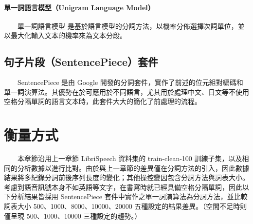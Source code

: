 \paragraph{單一詞語言模型（Unigram Language Model）} \hfill \break
%
　　單一詞語言模型 \cite{kudo2018subword} 是基於語言模型的分詞方法，以機率分佈選擇次詞單位，並以最大化輸入文本的機率來為文本分段。

\subsection{句子片段（SentencePiece）套件}

　　SentencePiece \cite{kudo_sentencepiece_2018}
是由 Google 開發的分詞套件，實作了前述的位元組對編碼和單一詞演算法。其優勢在於可應用於不同語言，尤其用於處理中文、日文等不使用空格分隔單詞的語言文本時，此套件大大的簡化了前處理的流程。

\section{衡量方式}

　　本章節沿用上一章節 LibriSpeech 資料集的 train-clean-100 訓練子集，以及相同的分析數據以進行比對。由於與上一章節的差異僅在分詞方法的引入，因此數據結果將多紀錄分詞前後序列長度的變化；其他操控變因包含分詞方法與詞表大小。考慮到語音訊號本身不如英語等文字，在書寫時就已經具備空格分隔單詞，因此以下分析結果皆採用 SentencePiece 套件中實作之單一詞演算法為分詞方法，並比較詞表大小 500、1000、8000、10000、20000 五種設定的結果差異。（空間不足時則僅呈現 500、1000、10000 三種設定的趨勢。）
